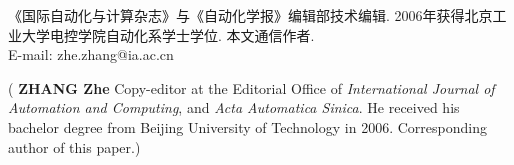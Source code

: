 \documentclass{Style/aas}
\begin{document}
\begin{multicols}{2}
  \begin{biography}
    \quad
    《国际自动化与计算杂志》与《自动化学报》编辑部技术编辑. 2006年获得北京工业大学电控学院自动化系学士学位.
    本文通信作者.\\E-mail: zhe.zhang@ia.ac.cn

    \noindent({\bf
      ZHANG Zhe
    }\quad
    Copy-editor at the Editorial Office of
    {\sl International Journal of Automation and Computing}, and {\sl
      Acta Automatica Sinica}. He received his bachelor degree from Beijing
    University of Technology in 2006. Corresponding author of this paper.)
  \end{biography}
\end{multicols}
\end{document}
